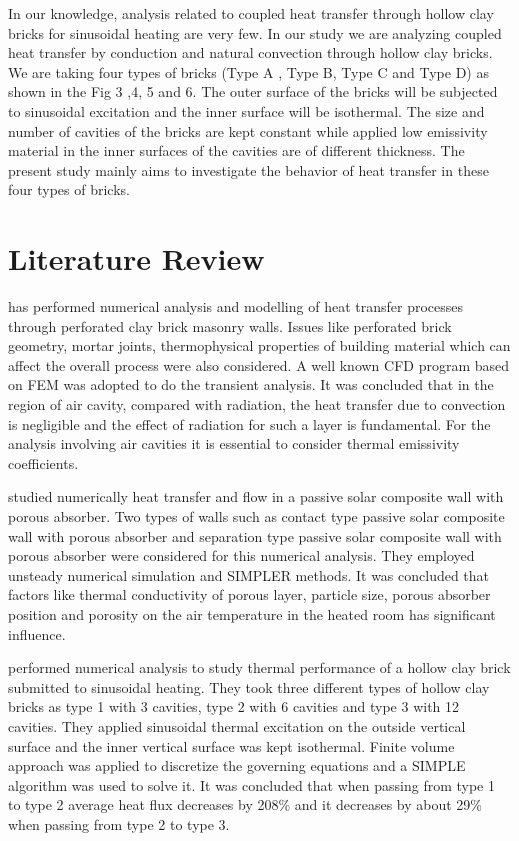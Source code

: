 \documentclass{article}
\begin{document}
\begin{multicols}{2}
             In our knowledge, analysis related to coupled heat transfer through hollow clay bricks for sinusoidal heating are very few. In our study we are analyzing coupled heat transfer by conduction and natural convection through hollow clay bricks. We are taking four types of bricks (Type A , Type B, Type C and Type D) as shown in the Fig 3 ,4, 5 and 6. The outer surface of the bricks will be subjected to sinusoidal excitation and the inner surface will be isothermal. The size and number of cavities of the bricks are kept constant while applied low emissivity material in the inner surfaces of the cavities are of different thickness. The present study mainly aims to investigate the behavior of heat transfer in these four types of bricks.
             


\section{Literature Review}
\textcite{kanellopoulos2017numerical} has performed numerical analysis and modelling of heat transfer processes through perforated clay brick masonry walls. Issues like perforated brick geometry, mortar joints, thermophysical properties of building material which can affect the overall process were also considered. A well known CFD program based on FEM was adopted to do the transient analysis. It was concluded that in the region of air cavity, compared with radiation, the heat transfer due to convection is negligible and the effect of radiation for such a layer is fundamental. For the analysis involving air cavities it is essential to consider thermal emissivity coefficients.

\textcite{chen2008numerical} studied numerically heat transfer and flow in a passive solar composite wall with porous absorber. Two types of walls such as contact type passive solar composite wall with porous absorber and separation type passive solar composite wall with porous absorber were considered for this numerical analysis. They employed unsteady numerical simulation and SIMPLER methods. It was concluded that factors like thermal conductivity of porous layer, particle size, porous absorber position and porosity on the air temperature in the heated room has significant influence.

\textcite{jamal2021thermal} performed numerical analysis to study thermal performance of a hollow clay brick submitted to sinusoidal heating. They took three different types of hollow clay bricks as type 1 with 3 cavities, type 2 with 6 cavities and type 3 with 12 cavities. They applied sinusoidal thermal excitation on the outside vertical surface and the inner vertical surface was kept isothermal. Finite volume approach was applied to discretize the governing equations and a SIMPLE algorithm was used to solve it. It was concluded that when passing from type 1 to type 2 average heat flux decreases by 208\% and it decreases by about 29\% when passing from type 2 to type 3.


\end{multicols}
\end{document}
